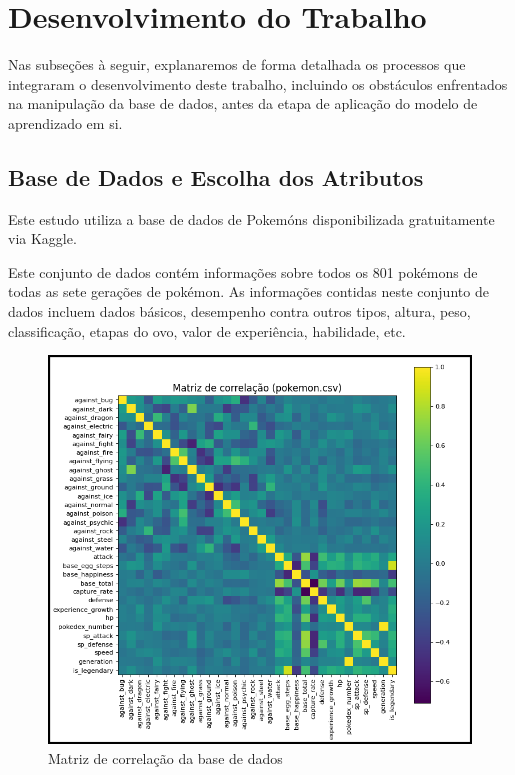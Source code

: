 \documentclass[12pt]{article}
\begin{document}
\section{Desenvolvimento do Trabalho}

Nas subseções à seguir, explanaremos de forma detalhada os processos que integraram o desenvolvimento deste trabalho, incluindo os obstáculos enfrentados na manipulação da base de dados, antes da etapa de aplicação do modelo de aprendizado em si.

\subsection{Base de Dados e Escolha dos Atributos} 

Este estudo utiliza a base de dados de Pokemóns \cite{Base} disponibilizada gratuitamente via Kaggle.

Este conjunto de dados contém informações sobre todos os 801 pokémons de todas as sete gerações de pokémon. As informações contidas neste conjunto de dados incluem dados básicos, desempenho contra outros tipos, altura, peso, classificação, etapas do ovo, valor de experiência, habilidade, etc.

\begin{figure}[H]
    \centering
    \includegraphics[width=14cm]{Images/correlation_matrix.png}
    \caption{Matriz de correlação da base de dados}
    \label{fig:exampleFig2}
\end{figure}
\end{document}
